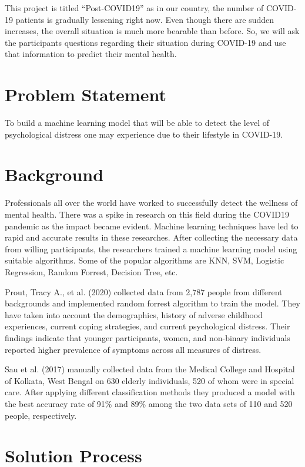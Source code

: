 \documentclass[12pt, english]{article}
\begin{document}
This project is titled “Post-COVID19” as in our country, the number of  COVID-19 patients is gradually lessening right now. Even though there are sudden increases, the overall situation is much more bearable than before. So, we will ask the participants questions regarding their situation during COVID-19 and use that information to predict their mental health. 


\section{Problem Statement}
To build a machine learning model that will be able to detect the level of psychological distress one may experience due to their lifestyle in COVID-19.

\section{Background}
Professionals all over the world have worked to successfully detect the wellness of mental health. There was a spike in research on this field during the COVID19 pandemic as the impact became evident. Machine learning techniques have led to rapid and accurate results in these researches. After collecting the necessary data from willing participants, the researchers trained a machine learning model using suitable algorithms. Some of the popular algorithms are KNN, SVM, Logistic Regression, Random Forrest, Decision Tree, etc. 

Prout, Tracy A., et al. (2020) collected data from 2,787 people from different backgrounds and implemented random forrest algorithm to train the model. They have taken into account the demographics, history of adverse childhood experiences, current coping strategies, and current psychological distress. Their findings indicate that younger participants, women, and non-binary individuals reported higher prevalence of symptoms across all measures of distress. \cite{2}

Sau et al. (2017) manually collected data from the Medical College and Hospital of Kolkata, West Bengal on 630 elderly individuals, 520 of whom were in special care. After applying different classification methods they produced a model with the best accuracy rate of 91\% and 89\% among the two data sets of 110 and 520 people, respectively. \cite{1}

\section{Solution Process}
\end{document}
